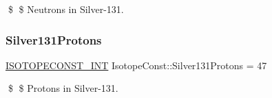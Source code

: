 \$ \$ Neutrons in Silver-\/131. \mbox{\label{group___isotope_const-_silver-_ag131_gaa974ac703491fcfdc85cef6be336f52f}} 
\subsubsection{\texorpdfstring{Silver131\+Protons}{Silver131Protons}}
{\footnotesize\ttfamily \mbox{\hyperlink{group___isotope_const-_macros_ga5f18360b3e99483a35c32d789e62621c}{I\+S\+O\+T\+O\+P\+E\+C\+O\+N\+S\+T\+\_\+\+I\+NT}} Isotope\+Const\+::\+Silver131\+Protons = 47}

\$ \$ Protons in Silver-\/131. 